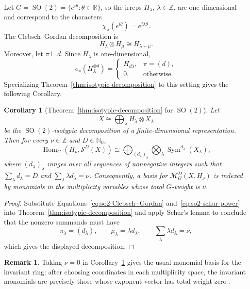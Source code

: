 \documentclass[11pt]{article}
\newcommand{\dsN}{\mathbb{N}}
\newcommand{\dsR}{\mathbb{R}}
\newcommand{\dsZ}{\mathbb{Z}}
\newcommand{\scM}{\mathcal{M}}
\newcommand{\scS}{\mathcal{S}}
\newcommand{\Sym}{\operatorname{Sym}}
\newcommand{\SO}{\operatorname{SO}}
\newtheorem{corollary}[theorem]{Corollary}
\theoremstyle{definition}
\newtheorem{remark}[theorem]{Remark}
\begin{document}
Let $G=\SO(2)=\{e^{i\theta}:\theta\in\dsR\}$, so the irreps $H_\lambda$, $\lambda\in\dsZ$, are one-dimensional and correspond to the characters
\begin{equation*}
  \chi_\lambda(e^{i\theta})=e^{i\lambda\theta}.
\end{equation*}
The Clebsch--Gordan decomposition is
\begin{equation}\label{eq:so2-Clebsch--Gordan}
  H_\lambda\otimes H_\mu\cong H_{\lambda+\mu}.
\end{equation}
Moreover, let $\pi\vdash d$.
Since $H_\lambda$ is one-dimensional,
\begin{equation}\label{eq:so2-schur-power}
  e_\pi(H_\lambda^{\otimes d})
  =
  \begin{cases}
    H_{d\lambda}, & \pi=(d),\\
    0, & \text{otherwise}.
  \end{cases}
\end{equation}
Specializing Theorem~\ref{thm:isotypic-decomposition} to this setting gives the following Corollary.

\begin{corollary}[Theorem~\ref{thm:isotypic-decomposition} for $\SO(2)$]\label{cor:so2-isotypic-decomposition}
  Let
  \[
    X\cong \bigoplus_{\lambda}H_\lambda\otimes X_\lambda
  \]
  be the $\SO(2)$-isotypic decomposition of a finite-dimensional representation.
  Then for every $\nu\in\dsZ$ and $D\in\dsN_0$,
  \[
    \operatorname{Hom}_{G}(H_\nu,\scS^D(X))
    \cong
    \bigoplus_{(d_\lambda)_{\lambda}}
    \bigotimes_{\lambda}\Sym^{d_\lambda}(X_\lambda),
  \]
  where $(d_\lambda)_\lambda$ ranges over all sequences of nonnegative integers such that $\sum_\lambda d_\lambda=D$ and $\sum_\lambda \lambda d_\lambda=\nu$.
  Consequently, a basis for $\scM_G^D(X,H_\nu)$ is indexed by monomials in the multiplicity variables whose total $G$-weight is $\nu$.
\end{corollary}
\begin{proof}
  Substitute Equations~\eqref{eq:so2-Clebsch--Gordan} and~\eqref{eq:so2-schur-power} into Theorem~\ref{thm:isotypic-decomposition} and apply Schur's lemma to conclude that the nonzero summands must have
  \[
    \pi_\lambda=(d_\lambda),\qquad
    \mu_\lambda=\lambda d_\lambda,\qquad
    \sum_\lambda \lambda d_\lambda=\nu,
  \]
  which gives the displayed decomposition.
\end{proof}

\begin{remark}
  Taking $\nu=0$ in Corollary~\ref{cor:so2-isotypic-decomposition} gives the usual monomial basis for the invariant ring: after choosing coordinates in each multiplicity space, the invariant monomials are precisely those whose exponent vector has total weight zero \cite[\S 1.4, Lemma~1.4.2]{Sturmfels2008}.
\end{remark}
\end{document}
